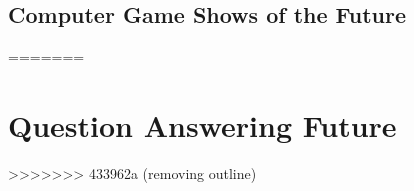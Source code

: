 \documentclass[bfivepaper,twosided,justified,nobib]{tufte-book}
\newcommand{\chapterfile}[2]{\chapter{#2}
  \label{ch:#1}
  }
\begin{document}



\chapterfile{game-show}{Computer Game Shows of the Future}
=======
\part{Question Answering Future}

>>>>>>> 433962a (removing outline)





\backmatter





\printindex
\end{document}
